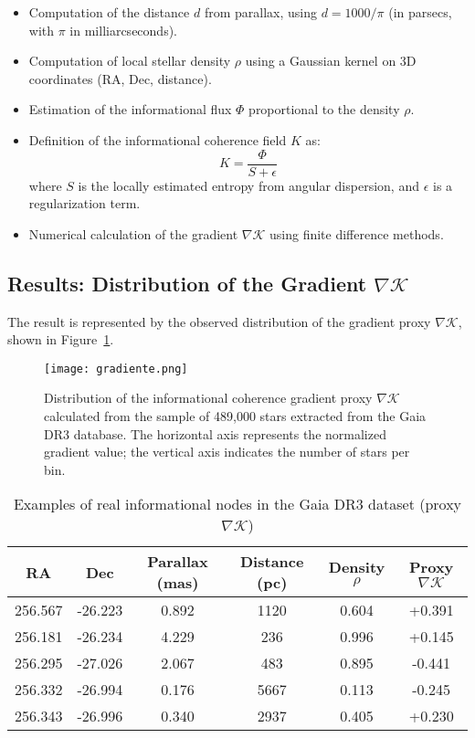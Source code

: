 \documentclass[12pt]{article}
\begin{document}
\begin{itemize}
    \item Computation of the distance $d$ from parallax, using $d = 1000 / \pi$ (in parsecs, with $\pi$ in milliarcseconds).
    \item Computation of local stellar density $\rho$ using a Gaussian kernel on 3D coordinates (RA, Dec, distance).
    \item Estimation of the informational flux $\Phi$ proportional to the density $\rho$.
    \item Definition of the informational coherence field $K$ as:
    \[
    K = \frac{\Phi}{S + \epsilon}
    \]
    where $S$ is the locally estimated entropy from angular dispersion, and $\epsilon$ is a regularization term.
    \item Numerical calculation of the gradient $\nabla \mathcal{K}$ using finite difference methods.
\end{itemize}
\subsection*{Results: Distribution of the Gradient $\nabla \mathcal{K}$}
The result is represented by the observed distribution of the gradient proxy $\nabla \mathcal{K}$, shown in Figure~\ref{fig:gradiente}.

\begin{figure}[H]
    \centering
    \texttt{[image: gradiente.png]}
    \caption{Distribution of the informational coherence gradient proxy $\nabla \mathcal{K}$ calculated from the sample of 489,000 stars extracted from the Gaia DR3 database. The horizontal axis represents the normalized gradient value; the vertical axis indicates the number of stars per bin.}
    \label{fig:gradiente}
\end{figure}

\begin{table}[H]
\centering
\caption{Examples of real informational nodes in the Gaia DR3 dataset (proxy $\nabla \mathcal{K}$)}
\label{tab:nodi}
\begin{tabular}{cccccc}
\toprule
RA & Dec & Parallax (mas) & Distance (pc) & Density $\rho$ & Proxy $\nabla \mathcal{K}$ \\
\midrule
256.567 & -26.223 & 0.892 & 1120 & 0.604 & +0.391 \\
256.181 & -26.234 & 4.229 & 236  & 0.996 & +0.145 \\
256.295 & -27.026 & 2.067 & 483  & 0.895 & -0.441 \\
256.332 & -26.994 & 0.176 & 5667 & 0.113 & -0.245 \\
256.343 & -26.996 & 0.340 & 2937 & 0.405 & +0.230 \\
\bottomrule
\end{tabular}
\end{table}
\end{document}
